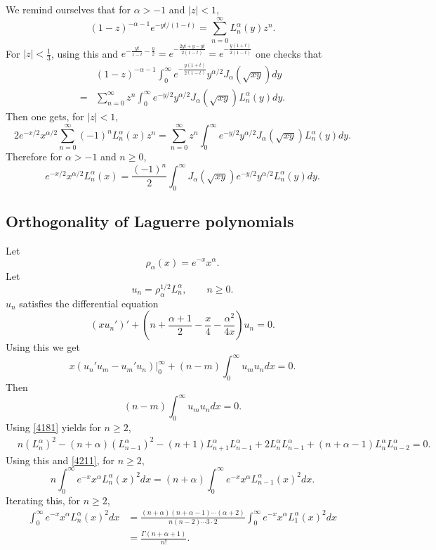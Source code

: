 \documentclass{article}
\theoremstyle{definition}
\begin{document}
We remind ourselves that for $\alpha>-1$ and $|z|<1$,
\[
(1-z)^{-\alpha-1} e^{-yt/(1-t)} = \sum_{n=0}^\infty L_n^\alpha(y) z^n.
\]
For $|z|<\frac{1}{3}$, using this 
and $e^{-\frac{yt}{1-t}-\frac{y}{2}} = e^{-\frac{2yt+y-yt}{2(1-t)}}=e^{-\frac{y(1+t)}{2(1-t)}}$
one checks that
\[
\begin{split}
&(1-z)^{-\alpha-1} \int_0^\infty e^{-\frac{y(1+t)}{2(1-t)}} y^{\alpha/2} J_\alpha(\sqrt{xy}) dy\\
=&\sum_{n=0}^\infty z^n \int_0^\infty e^{-y/2} y^{\alpha/2} J_\alpha(\sqrt{xy}) L_n^\alpha(y) dy.
\end{split}
\]
Then one gets, for $|z|<1$,
\[
2e^{-x/2} x^{\alpha/2} \sum_{n=0}^\infty (-1)^n L_n^\alpha(x) z^n = \sum_{n=0}^\infty z^n \int_0^\infty e^{-y/2}
y^{\alpha/2} J_\alpha(\sqrt{xy}) L_n^\alpha(y) dy.
\]
Therefore for $\alpha>-1$ and $n \geq 0$,
\begin{equation}
e^{-x/2} x^{\alpha/2} L_n^\alpha(x) = \frac{(-1)^n}{2} \int_0^\infty J_\alpha(\sqrt{xy}) e^{-y/2} y^{\alpha/2}
L_n^\alpha(y)dy.
\label{4203}
\end{equation}



\subsection{Orthogonality of Laguerre polynomials}
Let
\[
\rho_\alpha(x)=e^{-x} x^\alpha.
\]
Let
\[
u_n = \rho_\alpha^{1/2} L_n^\alpha,\qquad n \geq 0.
\]
$u_n$ satisfies the differential equation 
\[
(xu_n')'+\left(n+\frac{\alpha+1}{2}-\frac{x}{4}-\frac{\alpha^2}{4x}\right) u_n = 0.
\]
Using this we get
\[
x(u_n'u_m-u_m'u_n)\bigg|_0^\infty + (n-m) \int_0^\infty u_m u_n dx = 0.
\]
Then
\begin{equation}
(n-m) \int_0^\infty u_m u_n dx = 0.
\label{4211}
\end{equation}
Using \eqref{4181} yields for $n \geq 2$,
\[
\begin{split}
&n (L_n^\alpha)^2 - (n+\alpha)(L_{n-1}^\alpha)^2-(n+1)L_{n+1}^\alpha L_{n-1}^\alpha
+2L_n^\alpha L_{n-1}^\alpha + (n+\alpha-1)L_n^\alpha L_{n-2}^\alpha=0.
\end{split}
\]
Using this and \eqref{4211}, for $n \geq 2$,
\[
n\int_0^\infty e^{-x} x^\alpha L_n^\alpha(x)^2 dx = (n+\alpha)\int_0^\infty e^{-x} x^\alpha L_{n-1}^\alpha(x)^2 dx.
\]
Iterating this, for $n \geq 2$,
\begin{align*}
\int_0^\infty e^{-x} x^\alpha L_n^\alpha(x)^2 dx &=\frac{(n+\alpha)(n+\alpha-1)\cdots(\alpha+2)}{n(n-2)\cdots 3 \cdot 2} 
\int_0^\infty e^{-x} x^\alpha L_1^\alpha(x)^2 dx\\
&=\frac{\Gamma(n+\alpha+1)}{n!}.
\end{align*}
\end{document}
